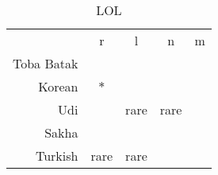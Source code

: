 \clearpage
\begin{table}[H]
\centering
\begin{tabular}{rcccc}
	\toprule
											& r	&	l	&	n	&	m \\

Toba Batak \\
Korean								&	     $*$ & \dingfont{✗} & & \\
Udi										&      \dingfont{✗} &      rare &      rare & \\
Sakha									& \dingfont{✗} & & &\\
Turkish								& rare & rare & & \\
\bottomrule
\end{tabular}
\caption{LOL}
\end{table}
